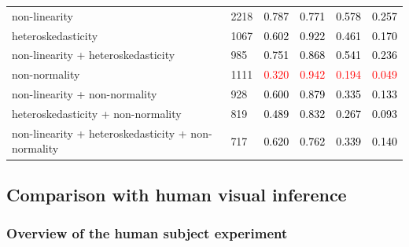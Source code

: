 \documentclass[]{interact}
\theoremstyle{plain}%
\theoremstyle{definition}
\theoremstyle{remark}
\begin{document}
\begin{table}
{\begin{tabular}[t]{ll>{}l>{}l>{}l>{}l}
\hspace{1em}non-linearity & 2218 & \textcolor{black}{0.787} & \textcolor{black}{0.771} & \textcolor{black}{0.578} & \textcolor{black}{0.257}\\
\hspace{1em}heteroskedasticity & 1067 & \textcolor{black}{0.602} & \textcolor{black}{0.922} & \textcolor{black}{0.461} & \textcolor{black}{0.170}\\
\hspace{1em}non-linearity + heteroskedasticity & 985 & \textcolor{black}{0.751} & \textcolor{black}{0.868} & \textcolor{black}{0.541} & \textcolor{black}{0.236}\\
\hspace{1em}non-normality & 1111 & \textcolor{red}{0.320} & \textcolor{red}{0.942} & \textcolor{red}{0.194} & \textcolor{red}{0.049}\\
\hspace{1em}non-linearity + non-normality & 928 & \textcolor{black}{0.600} & \textcolor{black}{0.879} & \textcolor{black}{0.335} & \textcolor{black}{0.133}\\
\hspace{1em}heteroskedasticity + non-normality & 819 & \textcolor{black}{0.489} & \textcolor{black}{0.832} & \textcolor{black}{0.267} & \textcolor{black}{0.093}\\
\hspace{1em}non-linearity + heteroskedasticity + non-normality & 717 & \textcolor{black}{0.620} & \textcolor{black}{0.762} & \textcolor{black}{0.339} & \textcolor{black}{0.140}\\
\bottomrule
\end{tabular}}
\end{table}

\hypertarget{comparison-with-human-visual-inference}{%
\subsection{Comparison with human visual
inference}\label{comparison-with-human-visual-inference}}

\hypertarget{overview-of-the-human-subject-experiment}{%
\subsubsection{Overview of the human subject
experiment}\label{overview-of-the-human-subject-experiment}}
\end{document}
